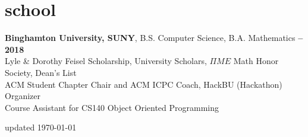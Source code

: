 \documentclass[margin,10pt]{res/res}
\begin{document}
\section{\sc \lsstyle school}
    \textbf{Binghamton University, SUNY}, B.S. Computer Science, B.A. Mathematics\hfill
    \textsc{\bfseries{} -- 2018}\\
    Lyle \& Dorothy Feisel Scholarship, University Scholars, $\Pi ME$ Math Honor Society, Dean's List\\
    ACM Student Chapter Chair and ACM ICPC Coach, HackBU (Hackathon) Organizer\\
    Course Assistant for CS140 Object Oriented Programming

\begin{minipage}[t]{\textwidth}
    \flushright
    \small
    \sc \lsstyle
    \hfill updated \today
\end{minipage}
\end{document}
